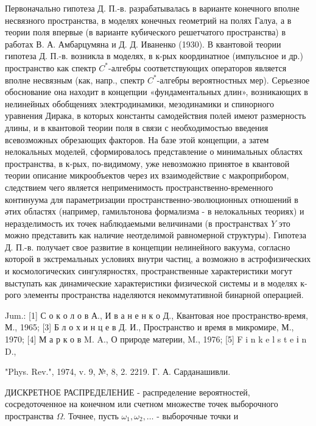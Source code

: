 \documentclass[10pt]{article}
\begin{document}
Первоначально гипотеза Д. П.-в. разрабатывалась в варианте конечного вполне несвязного пространства, в моделях конечных геометрий на полях Галуа, а в теории поля впервые (в варианте кубического решетчатого пространства) в работах В. А. Амбарцумяна и Д. Д. Иваненко (1930). В квантовой теории гипотеза Д. П.-в. возникла в моделях, в к-рых координатное (импульсное и др.) пространство как спектр $C^{*}$-алгебры соответствующих операторов является вполне несвязным (как, напр., спектр $C^{*}$-алгебры вероятностных мер). Серьезное обоснование она находит в концепции «фундаментальных длин», возникающих в нелинейных обобщениях электродинамики, мезодинамики и спинорного уравнения Дирака, в которых константы самодействия полей имеют размерность длины, и в квантовой теории поля в связи с необходимостью введения всевозможных обрезающих факторов. На базе этой концепции, а затем нелокальных моделей, сформировалось представление о минимальных областях пространства, в к-рых, по-видимому, уже невозможно принятое в квантовой теории описание микрообъектов через их взаимодействие с макроприбором, следствием чего является неприменимость пространственно-временного континуума для параметризации пространственно-эволюционных отношений в әтих областях (например, гамильтонова формализма - в нелокальных теориях) и неразделимость их точек наблюдаемыми величинами (в пространствах $Y$ это можно представить как наличие неотделимой равномерной структуры). Гипотеза Д. П.-в. получает свое развитие в концепции нелинейного вакуума, согласно которой в экстремальных условиях внутри частиц, а возможно в астрофизических и космологических сингулярностях, пространственные характеристики могут выступать как динамические характеристики физической системы и в моделях к-рого элементы пространства наделяются некоммутативной бинарной операцией.



Jum.: [1] С о к о л о в А., И в а н е н к о Д., Квантовая ное пространство-время, М., 1965; [3] Б л о х и н ц е в Д. И., Пространство и время в микромире, М., 1970; [4] М а р к о в M. A., О природе материи, M., 1976; [5] F i n k e l s t e і n D.,

"Phys. Rev.", 1974, v. 9, №, 8, 2. 2219. Г. А. Сарданашивли.



ДИСКРЕТНОЕ РАСПРЕДЕЛЕНИЕ - распределение вероятностей, сосредоточенное на конечном или счетном множестве точек выборочного пространства $\Omega$. Точнее, пусть $\omega_{1}, \omega_{2}, \ldots$ - выборочные точки и
\end{document}
